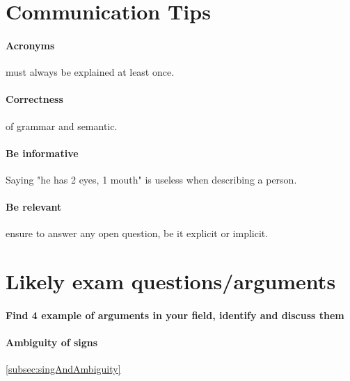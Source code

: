 \documentclass{article}
\begin{document}
\appendix
\section{Communication Tips}
\paragraph{Acronyms} must always be explained at least once.
\paragraph{Correctness} of grammar and semantic.
\paragraph{Be informative} Saying "he has 2 eyes, 1 mouth" is useless when describing a person.
\paragraph{Be relevant} ensure to answer any open question, be it explicit or implicit.
\section{Likely exam questions/arguments}
\paragraph{Find 4 example of arguments in your field, identify and discuss them}
\paragraph{Ambiguity of signs} \ref{subsec:singAndAmbiguity}
\end{document}
